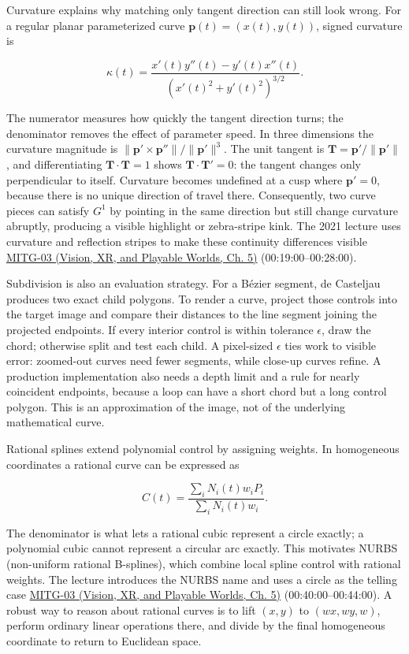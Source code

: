 Curvature explains why matching only tangent direction can still look wrong. For a regular planar parameterized curve \(\boldsymbol{p}(t)=(x(t),y(t))\), signed curvature is

\[
\kappa(t)=\frac{x'(t)y''(t)-y'(t)x''(t)}
{\left(x'(t)^2+y'(t)^2\right)^{3/2}}.
\]

The numerator measures how quickly the tangent direction turns; the denominator removes the effect of parameter speed. In three dimensions the curvature magnitude is \(\|\boldsymbol{p}'\times\boldsymbol{p}''\|/\|\boldsymbol{p}'\|^3\). The unit tangent is \(\boldsymbol{T}=\boldsymbol{p}'/\|\boldsymbol{p}'\|\), and differentiating \(\boldsymbol{T}\cdot\boldsymbol{T}=1\) shows \(\boldsymbol{T}\cdot\boldsymbol{T}'=0\): the tangent changes only perpendicular to itself. Curvature becomes undefined at a cusp where \(\boldsymbol{p}'=0\), because there is no unique direction of travel there. Consequently, two curve pieces can satisfy \(G^1\) by pointing in the same direction but still change curvature abruptly, producing a visible highlight or zebra-stripe kink. The 2021 lecture uses curvature and reflection stripes to make these continuity differences visible \href{../07-Vision-XR-and-Playable-Worlds/main.pdf\#nameddest=04-visual-computing-ii-ch036-mitg-03---curves-and-surfaces}{MITG-03 (Vision, XR, and Playable Worlds, Ch. 5)} (00:19:00--00:28:00).

Subdivision is also an evaluation strategy. For a Bézier segment, de Casteljau produces two exact child polygons. To render a curve, project those controls into the target image and compare their distances to the line segment joining the projected endpoints. If every interior control is within tolerance \(\epsilon\), draw the chord; otherwise split and test each child. A pixel-sized \(\epsilon\) ties work to visible error: zoomed-out curves need fewer segments, while close-up curves refine. A production implementation also needs a depth limit and a rule for nearly coincident endpoints, because a loop can have a short chord but a long control polygon. This is an approximation of the image, not of the underlying mathematical curve.

Rational splines extend polynomial control by assigning weights. In homogeneous coordinates a rational curve can be expressed as

\[
C(t)=\frac{\sum_i N_i(t)w_iP_i}{\sum_i N_i(t)w_i}.
\]

The denominator is what lets a rational cubic represent a circle exactly; a polynomial cubic cannot represent a circular arc exactly. This motivates NURBS (non-uniform rational B-splines), which combine local spline control with rational weights. The lecture introduces the NURBS name and uses a circle as the telling case \href{../07-Vision-XR-and-Playable-Worlds/main.pdf\#nameddest=04-visual-computing-ii-ch036-mitg-03---curves-and-surfaces}{MITG-03 (Vision, XR, and Playable Worlds, Ch. 5)} (00:40:00--00:44:00). A robust way to reason about rational curves is to lift \((x,y)\) to \((wx,wy,w)\), perform ordinary linear operations there, and divide by the final homogeneous coordinate to return to Euclidean space.

